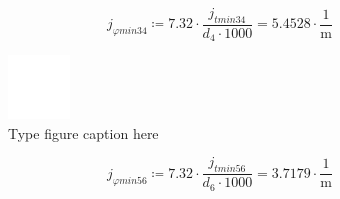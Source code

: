 \documentclass{article}
\newcommand{\defeq}{\coloneq} %
\begin{document}
\begin{equation*}
\textit{j}_{\textit{φmin34}} \defeq 7.32 \cdot \frac{\textit{j}_{\textit{tmin34}}}{\textit{d}_{\textit{4}} \cdot 1000} = {5.4528 \cdot \frac{1}{\mathrm{m}}}
\end{equation*}
\begin{figure}[h!]
 \begin{center}
  \includegraphics[max width=\textwidth]{calculations/874.png}
  \caption{Type figure caption here}
  \label{fig:874}
 \end{center}
\end{figure}
\begin{equation*}
\textit{j}_{\textit{φmin56}} \defeq 7.32 \cdot \frac{\textit{j}_{\textit{tmin56}}}{\textit{d}_{\textit{6}} \cdot 1000} = {3.7179 \cdot \frac{1}{\mathrm{m}}}
\end{equation*}
\end{document}
